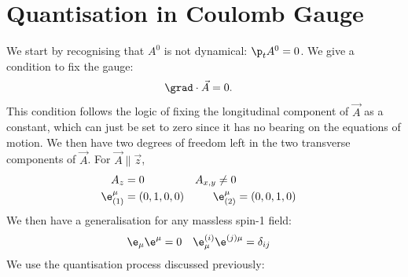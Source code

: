 \documentclass[a4paper, 11pt, normalem]{report}
\begin{document}
\section{Quantisation in Coulomb Gauge}
We start by recognising that $A^0$ is not dynamical: $\p_t A^0 = 0$.
We give a condition to fix the gauge:
\begin{align}
    \grad\cdot\vec{A}&= 0.
\end{align}
This condition follows the logic of fixing the longitudinal component of $\vec{A}$ as a constant, which can just be set to zero since it has no bearing on the equations of motion.
We then have two degrees of freedom left in the two transverse components of $\vec{A}$.
For $\vec{A}\parallel\vec{z}$,
\begin{align}
    A_z &= 0 & A_{x,y} \neq 0 \\
    \e_{(1)}^\mu &= (0,1,0,0) & \e_{(2)}^\mu &= (0,0,1,0)
\end{align}
We then have a generalisation for any massless spin-1 field:
\begin{align}
    \e_\mu\e^\mu &= 0 & \e_\mu^{(i)}\e^{(j)\mu} &= \delta_{ij}
\end{align}
We use the quantisation process discussed previously:
\end{document}
